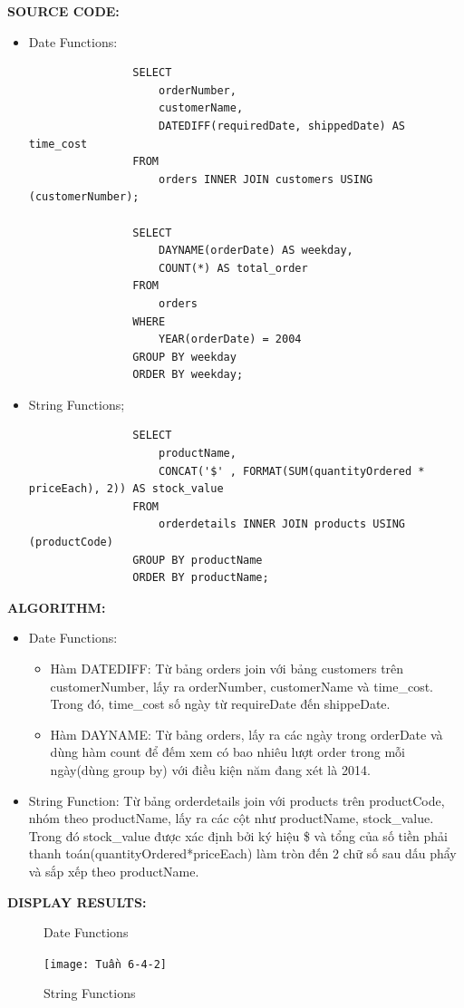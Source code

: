 \documentclass[12pt,a4paper]{report}
\begin{document}
	{\bf SOURCE CODE:}
	\begin{itemize}
		\item Date Functions:
			\begin{lstlisting}
				SELECT
					orderNumber,
    				customerName,
    				DATEDIFF(requiredDate, shippedDate) AS time_cost
				FROM
					orders INNER JOIN customers USING (customerNumber);
    
				SELECT
					DAYNAME(orderDate) AS weekday,
    				COUNT(*) AS total_order
				FROM
					orders
				WHERE
					YEAR(orderDate) = 2004
				GROUP BY weekday
				ORDER BY weekday;
			\end{lstlisting}
		\item String Functions;
			\begin{lstlisting}
				SELECT
					productName,
					CONCAT('$' , FORMAT(SUM(quantityOrdered * priceEach), 2)) AS stock_value
				FROM
					orderdetails INNER JOIN products USING (productCode)
				GROUP BY productName
				ORDER BY productName;
			\end{lstlisting}
	\end{itemize}
	
	{\bf ALGORITHM:}
	\begin{itemize}
		\item Date Functions:
		\begin{itemize}
			\item Hàm DATEDIFF: Từ bảng orders join với bảng customers trên customerNumber, lấy ra orderNumber, customerName và time\_cost. Trong đó, time\_cost số ngày từ requireDate đến shippeDate.
			\item Hàm DAYNAME: Từ bảng orders, lấy ra các ngày trong orderDate và dùng hàm count để đếm xem có bao nhiêu lượt order trong mỗi ngày(dùng group by) với điều kiện năm đang xét là 2014.
		\end{itemize}
		\item String Function: Từ bảng orderdetails join với products trên productCode, nhóm theo productName, lấy ra các cột như productName, stock\_value. Trong đó stock\_value được xác định bởi ký hiệu \$ và tổng của số tiền phải thanh toán(quantityOrdered*priceEach) làm tròn đến 2 chữ số sau dấu phẩy và sắp xếp theo productName.
	\end{itemize}
	
	{\bf DISPLAY RESULTS:}
		\begin{figure}[h]
		\hfill
		\hfill
		\caption{Date Functions}
		\end{figure}
		\begin{figure}[!h]
			\texttt{[image: Tuần 6-4-2]}
			\caption{String Functions}
		\end{figure}
\end{document}
